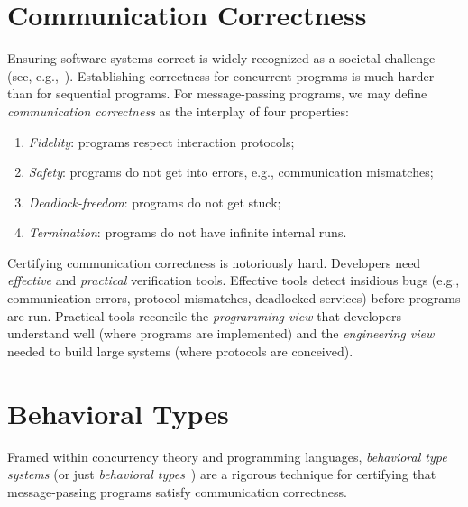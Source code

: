 \documentclass[sigplan,10pt]{acmart}\settopmatter{printfolios=false,printccs=false,printacmref=false}
\begin{document}


\maketitle




\section{Communication Correctness}
Ensuring software systems correct is widely recognized as a societal challenge (see, e.g.,~\cite{DBLP:conf/isola/HuismanBBDGLPV16}). 
Establishing correctness for concurrent programs is much harder than for sequential programs.
For message-passing programs, we may define \emph{communication correctness} as the interplay of four properties: 
\begin{enumerate}[-]
\item \emph{Fidelity}: programs respect interaction protocols; 
\item \emph{Safety}: programs do not get into errors, e.g., communication mismatches; 
\item \emph{Deadlock-freedom}: programs do not get stuck; 
\item \emph{Termination}: programs do not have infinite internal runs.
\end{enumerate}
Certifying communication correctness is notoriously hard. Developers need \emph{effective} and \emph{practical} verification tools. Effective tools detect insidious bugs (e.g., communication errors, protocol mismatches, deadlocked services) before programs are run. 
Practical tools reconcile the \emph{programming view} that developers understand well (where programs are implemented) and the \emph{engineering view} needed to build large systems (where protocols are conceived).


\section{Behavioral Types}
Framed within concurrency theory and programming languages, \emph{behavioral type systems} 
(or just \emph{behavioral types}~\cite{DBLP:journals/csur/HuttelLVCCDMPRT16}) 
are a rigorous technique for certifying  that 
message-passing programs satisfy
communication correctness.
\end{document}
